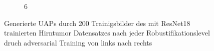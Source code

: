 \begin{figure}[ht!]
\begin{subfigure}{0.095\linewidth}
        \caption{6}
    \end{subfigure}
    \caption{Generierte UAPs durch 200 Trainigsbilder des mit ResNet18 trainierten Hirntumor Datensatzes nach jeder Robustifikationslevel druch adversarial Training von links nach rechts}
    \label{fig:uap-resnet18-covidx-rob0}
\end{figure}



